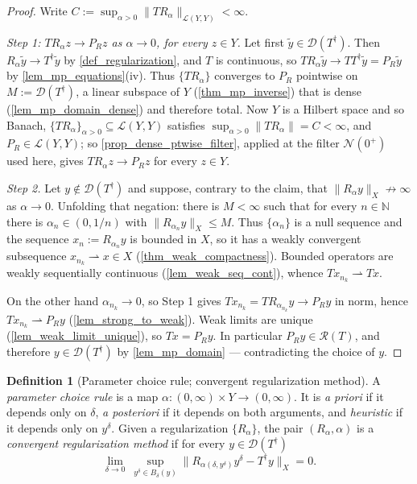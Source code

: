 \documentclass[a4paper]{report}
\theoremstyle{plain}
\theoremstyle{definition}
\newtheorem{definition}[theorem]{Definition}
\theoremstyle{remark}
\newcommand{\Ll}{\mathcal{L}}
\newcommand{\Ran}{\mathcal{R}}
\newcommand{\Dom}{\mathcal{D}}
\newcommand{\dg}{^{\dagger}}
\newcommand{\wc}{\rightharpoonup}
\begin{document}
\begin{proof}
  Write $C := \sup_{\alpha > 0}\|TR_{\alpha}\|_{\Ll(Y,Y)} < \infty$.

  \emph{Step 1: $TR_{\alpha}z \to P_Rz$ as $\alpha \to 0$, for every $z \in Y$.}  Let
  first $\tilde{y} \in \Dom(T\dg)$.  Then $R_{\alpha}\tilde{y} \to T\dg\tilde{y}$ by
  \cref{def_regularization}, and $T$ is continuous, so
  $TR_{\alpha}\tilde{y} \to TT\dg\tilde{y} = P_R\tilde{y}$ by
  \cref{lem_mp_equations}(iv).  Thus $\{TR_{\alpha}\}$ converges to $P_R$ pointwise on
  $M := \Dom(T\dg)$, a linear subspace of $Y$ (\cref{thm_mp_inverse}) that is dense
  (\cref{lem_mp_domain_dense}) and therefore total.  Now $Y$ is a Hilbert space and so
  Banach, $\{TR_{\alpha}\}_{\alpha>0} \subseteq \Ll(Y,Y)$ satisfies
  $\sup_{\alpha>0}\|TR_{\alpha}\| = C < \infty$, and $P_R \in \Ll(Y,Y)$; so
  \cref{prop_dense_ptwise_filter}, applied at the filter $\mathcal{N}(0^{+})$ used here,
  gives $TR_{\alpha}z \to P_Rz$ for every $z \in Y$.

  \emph{Step 2.}  Let $y \notin \Dom(T\dg)$ and suppose, contrary to the claim, that
  $\|R_{\alpha}y\|_X \not\to \infty$ as $\alpha \to 0$.  Unfolding that negation: there is
  $M < \infty$ such that for every $n \in \mathbb{N}$ there is $\alpha_n \in (0,1/n)$ with
  $\|R_{\alpha_n}y\|_X \le M$.  Thus $\{\alpha_n\}$ is a null sequence and the sequence
  $x_n := R_{\alpha_n}y$ is bounded in $X$, so it has a weakly convergent subsequence
  $x_{n_k} \wc x \in X$ (\cref{thm_weak_compactness}).  Bounded operators are weakly
  sequentially continuous (\cref{lem_weak_seq_cont}), whence $Tx_{n_k} \wc Tx$.

  On the other hand $\alpha_{n_k} \to 0$, so Step 1 gives
  $Tx_{n_k} = TR_{\alpha_{n_k}}y \to P_Ry$ in norm, hence $Tx_{n_k} \wc P_Ry$
  (\cref{lem_strong_to_weak}).  Weak limits are unique (\cref{lem_weak_limit_unique}), so
  $Tx = P_Ry$.  In particular $P_Ry \in \Ran(T)$, and therefore $y \in \Dom(T\dg)$ by
  \cref{lem_mp_domain} --- contradicting the choice of $y$.
\end{proof}


\begin{definition}[Parameter choice rule; convergent regularization method]
  \label{def_parameter_choice}
  A \emph{parameter choice rule} is a map $\alpha \colon (0,\infty) \times Y \to
  (0,\infty)$.  It is \emph{a priori} if it depends only on $\delta$, \emph{a posteriori}
  if it depends on both arguments, and \emph{heuristic} if it depends only on
  $y^{\delta}$.  Given a regularization $\{R_{\alpha}\}$, the pair $(R_{\alpha}, \alpha)$
  is a \emph{convergent regularization method} if for every $y \in \Dom(T\dg)$
  \[
    \lim_{\delta \to 0}\ \sup_{y^{\delta} \in B_{\delta}(y)}
      \bigl\| R_{\alpha(\delta, y^{\delta})} y^{\delta} - T\dg y \bigr\|_X = 0 .
  \]
\end{definition}
\end{document}
